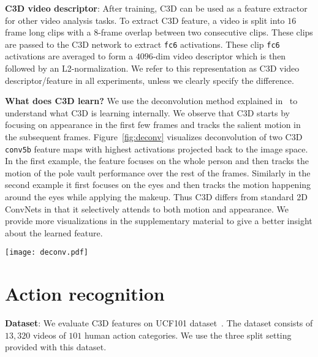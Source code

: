 \documentclass[10pt,twocolumn,letterpaper]{article}
\begin{document}
{\bf C3D video descriptor}: After training, C3D can be used as a feature extractor for other video analysis tasks. To extract C3D feature, a video is split into $16$ frame long clips with a 8-frame overlap between two consecutive clips. These clips are passed to the C3D network to extract \texttt{fc6} activations. These clip \texttt{fc6} activations are averaged to form a $4096$-dim video descriptor which is then followed by an L2-normalization. We refer to this representation as C3D video descriptor/feature in all experiments, unless we clearly specify the difference.

{\bf What does C3D learn?} We use the deconvolution method explained in~\cite{ZeilerF14} to understand what C3D is learning internally. We observe that C3D starts by focusing on appearance in the first few frames and tracks the salient motion in the subsequent frames. Figure~\ref{fig:deconv} visualizes deconvolution of two C3D \texttt{conv5b} feature maps with highest activations projected back to the image space. In the first example, the feature focuses on the whole person and then tracks the motion of the pole vault performance over the rest of the frames. Similarly in the second example it first focuses on the eyes and then tracks the motion happening around the eyes while applying the makeup. Thus C3D differs from standard 2D ConvNets in that it selectively attends to both motion and appearance. We provide more visualizations in the supplementary material to give a better insight about the learned feature. 

\begin{figure*}
\begin{center}
   \texttt{[image: deconv.pdf]}
\end{center}
\vspace{-12pt}
   \caption{{\bf Visualization of C3D model, using the method from~\cite{ZeilerF14}}. Interestingly, C3D captures appearance for the first few frames but thereafter only attends to salient motion. Best viewed on a color screen.}
\label{fig:deconv}
\end{figure*}
%
 
\section{Action recognition}
\label{sec:action_recognition}
{\bf Dataset}: We evaluate C3D features on UCF101 dataset~\cite{UCF101}. The dataset consists of $13,320$ videos of $101$ human action categories. We use the three split setting provided with this dataset.
\end{document}
